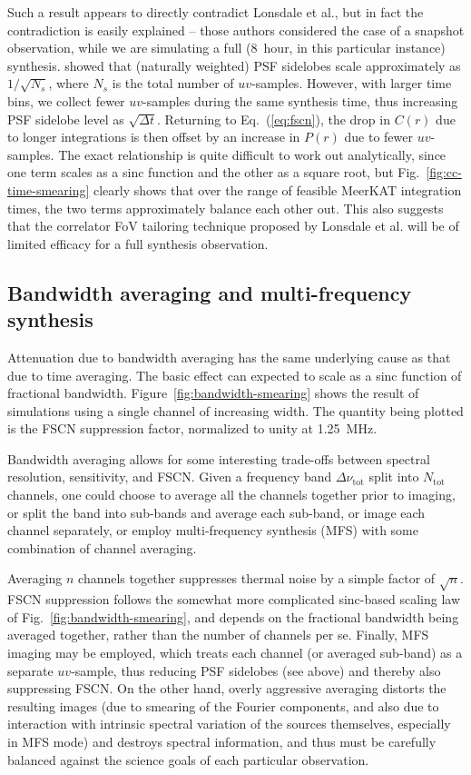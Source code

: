\documentclass{aa}
\begin{document}
Such a result appears to directly contradict Lonsdale et al., but in fact the contradiction is easily explained -- those authors considered the case of a snapshot observation, while we are simulating a full (8~hour, in this particular instance) synthesis. \citet{SKA49} showed that (naturally weighted) PSF sidelobes scale approximately as $1/\sqrt{N_s}$, where $N_s$ is the total number of $uv$-samples. However, with larger time bins, we collect fewer $uv$-samples during the same synthesis time, thus increasing PSF sidelobe level as $\sqrt{\Delta t}$. Returning to Eq.~(\ref{eq:fscn}), the drop in $C(r)$ due to longer integrations is then offset by an increase in $P(r)$ due to fewer $uv$-samples. The exact relationship is quite difficult to work out analytically, since one term scales as a sinc function and the other as a square root, but  Fig.~\ref{fig:cc-time-smearing} clearly shows that over the range of feasible MeerKAT integration times, the two terms approximately balance each other out. This also 
suggests that the correlator FoV tailoring technique proposed by Lonsdale et al. will be of limited efficacy for a full synthesis observation.

\subsection{Bandwidth averaging and multi-frequency synthesis}
\label{sec:freq-avg}

Attenuation due to bandwidth averaging has the same underlying cause as that due to time averaging. The basic effect can expected to scale as a sinc function of fractional bandwidth. Figure~\ref{fig:bandwidth-smearing} shows the result of simulations using a single channel of increasing width. The quantity being plotted is the FSCN suppression factor, normalized to unity at 1.25~MHz.

Bandwidth averaging allows for some interesting trade-offs between spectral resolution, sensitivity, and FSCN. Given a frequency band $\Delta\nu_\mathrm{tot}$ split into $N_\mathrm{tot}$ channels, one could choose to average all the channels together prior to imaging, or split the band into sub-bands and average each sub-band, or image each channel separately, or employ multi-frequency synthesis (MFS) with some combination of channel averaging. 

Averaging $n$ channels together suppresses thermal noise by a simple factor of $\sqrt{n}$. FSCN suppression follows the somewhat more complicated sinc-based scaling law of Fig.~\ref{fig:bandwidth-smearing}, and depends on the fractional bandwidth being averaged together, rather than the number of channels per se. Finally, MFS imaging may be employed, which treats each channel (or averaged sub-band) as a separate $uv$-sample, thus reducing PSF sidelobes (see above) and thereby also suppressing FSCN. On the other hand, overly aggressive averaging distorts the resulting images (due to smearing of the Fourier components, and also due to interaction with intrinsic spectral variation of the sources themselves, especially in MFS mode) and destroys spectral information, and thus must be carefully balanced against the science goals of each particular observation.
\end{document}
